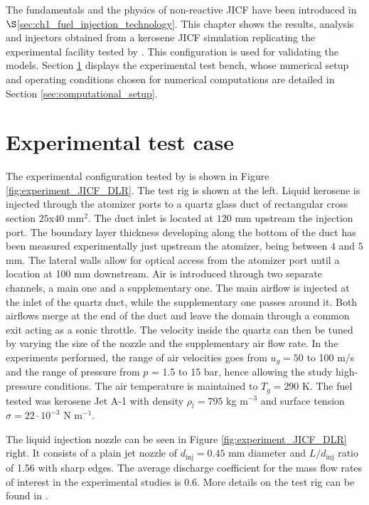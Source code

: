 The fundamentals and the physics of non-reactive JICF have been introduced in $\S$\ref{sec:ch1_fuel_injection_technology}. This chapter shows the results, analysis and injectors obtained from a kerosene JICF simulation replicating the experimental facility tested by . This configuration is used for validating the models. Section \ref{sec:ch5_experimental_bench} displays the experimental test bench, whose numerical setup and operating conditions chosen for numerical computations are detailed in Section \ref{sec:computational_setup}.


\section{Experimental test case}
	\label{sec:ch5_experimental_bench}

The experimental configuration tested by  is shown in Figure \ref{fig:experiment_JICF_DLR}. The test rig is shown at the left. Liquid kerosene is injected through the atomizer ports to a quartz glass duct of rectangular cross section $25$x$40$ mm$^2$. The duct inlet is located at $120$ mm upstream the injection port. The boundary layer thickness developing along the bottom of the duct has been measured experimentally just upstream the atomizer, being between $4$ and $5$ mm. The lateral walls allow for optical access from the atomizer port until a location at 100 mm downstream. Air is introduced through two separate channels, a main one and a supplementary one. The main airflow is injected at the inlet of the quartz duct, while the supplementary one passes around it. Both airflows merge at the end of the duct and leave the domain through a common exit acting as a sonic throttle. The velocity inside the quartz can then be tuned by varying the size of the nozzle and the supplementary air flow rate. In the experiments performed, the range of air velocities goes from $u_g = 50$ to 100 m/s and the range of pressure from $p$ = 1.5 to 15 bar, hence allowing the study high-pressure conditions. The air temperature is maintained to $T_g = 290$ K. The fuel tested was kerosene Jet A-1 with density $\rho_l = 795$ kg m$^{-3}$ and surface tension $\sigma = 22 \cdot 10^{-3}$ N m$^{-1}$.

The liquid injection nozzle can be seen in Figure \ref{fig:experiment_JICF_DLR} right. It consists of a plain jet nozzle of $d_\mathrm{inj} =  0.45$ mm diameter and $L/d_\mathrm{inj}$ ratio of 1.56 with sharp edges. The average discharge coefficient for the mass flow rates of interest in the experimental studies is $0.6$. More details on the test rig can be found in .

